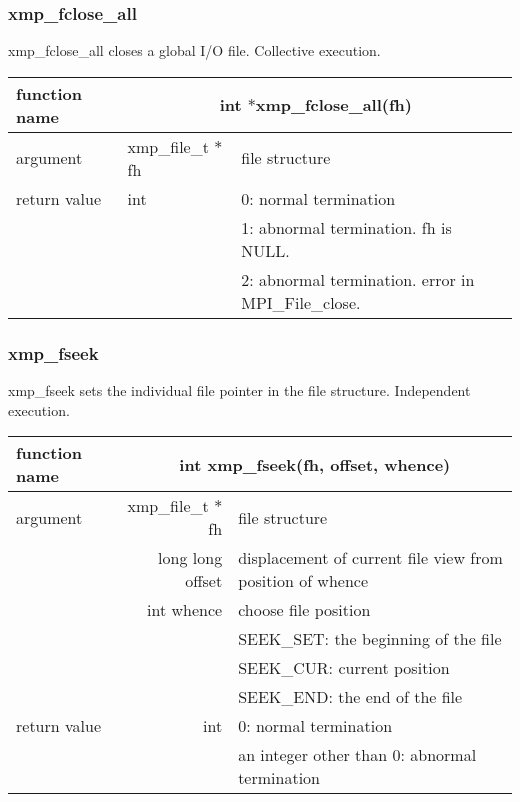    \subsubsection{xmp\_fclose\_all}
   xmp\_fclose\_all closes a global I/O file. Collective execution.

   \begin{table}[h]
    \begin{center}
     \begin{tabular}{|l|l|p{80mm}|}
      \hline
      {\bf function name}  & \multicolumn{2}{c|}{\bf int
      $*$xmp\_fclose\_all(fh)} \\ \hline \hline
      argument & xmp\_file\_t $*$fh & file structure \\ \hline
      return value & int & 0: normal termination \\
      &  & 1: abnormal termination. fh is NULL. \\
      &  & 2: abnormal termination. error in MPI\_File\_close. \\ \hline
      \end{tabular}
     \end{center}
    \label{tb:close}
   \end{table}

   \subsubsection{xmp\_fseek}
   xmp\_fseek sets the individual file pointer in the file structure. Independent execution.

   \begin{table}[h]
    \begin{center}
     \begin{tabular}{|l|r|p{70mm}|}
      \hline
      {\bf function name}  & \multicolumn{2}{c|}{\bf int xmp\_fseek(fh,
      offset, whence)}  \\ \hline \hline
      argument & xmp\_file\_t $*$fh & file structure \\ \cline{2-3}
      & long long offset & displacement of current file view from
	      position of whence \\ \cline{2-3}
      & int whence & choose file position \\
      &  & SEEK\_SET: the beginning of the file \\ 
      &  & SEEK\_CUR: current position \\ 
      &  & SEEK\_END: the end of the file \\ \hline
      return value & int & 0: normal termination \\
      &  & an integer other than 0: abnormal termination \\ \hline
      \end{tabular}
     \end{center}
    \label{tb:aaa}
   \end{table}

